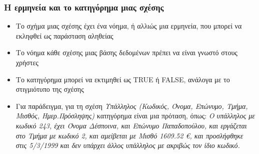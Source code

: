 \begin{frame}[t,fragile]
\frametitle{Η ερμηνεία και το κατηγόρημα μιας σχέσης}
\begin{minipage}{\wE}
\pause
\begin{itemize} [<+->] \itemsep 6pt
 \item  Το σχήμα μιας σχέσης έχει ένα νόημα, ή αλλιώς μια ερμηνεία, 
       που μπορεί να εκληφθεί ως παράσταση αληθείας
 \item  Το νόημα κάθε σχέσης μιας βάσης δεδομένων πρέπει να είναι γνωστό στους χρήστες
 \item Το κατηγόρημα μπορεί να εκτιμηθεί ως {\sq TRUE} ή {\sq FALSE}, 
       ανάλογα με το στιγμιότυπο της σχέσης
 \item  Για παράδειγμα, για τη σχέση 
\emph{Υπάλληλος (Κωδικός, Όνομα, Επώνυμο, Τμήμα, Μισθός, Ημερ.Πρόσληψης)}
κατηγόρημα είναι μια πρόταση, όπως:
\textit{Ο υπάλληλος με κωδικό 243, έχει Όνομα Δέσποινα, και Επώνυμο Παπαδοπούλου, 
και εργάζεται στο Τμήμα με κωδικό 2,
και αμείβεται με Μισθό 1609.52 \euro, και προσλήφθηκε στις 5/3/1999 και δεν υπάρχει άλλος υπάλληλος με ακριβώς
τον ίδιο κωδικό.}
\end{itemize}
\end{minipage}
\end{frame}
